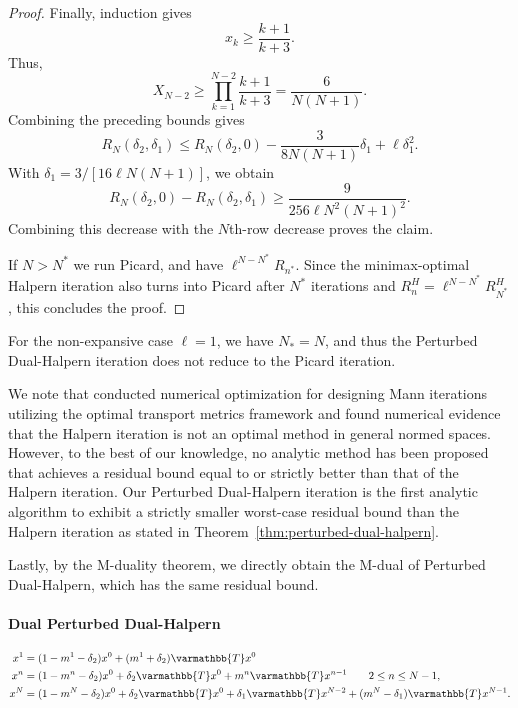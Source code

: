 \documentclass[pdflatex,sn-mathphys-num]{sn-jnl}%
\newcommand{\opT}{{\varmathbb{T}}}
\theoremstyle{thmstyleone}%
\theoremstyle{thmstyletwo}%
\theoremstyle{thmstylethree}%
\begin{document}
\begin{proof}
Finally, induction gives
\[x_k\ge\frac{k+1}{k+3}.\]
Thus,
\[X_{N-2}\ge\prod_{k=1}^{N-2}\frac{k+1}{k+3}=\frac{6}{N(N+1)}.\]
Combining the preceding bounds gives
\[R_N(\delta_2,\delta_1)\le R_N(\delta_2,0)-\frac{3}{8N(N+1)}\delta_1+\ell\delta_1^2.\]
With $\delta_1=3/[16\ell N(N+1)]$, we obtain
\[R_N(\delta_2,0)-R_N(\delta_2,\delta_1)\ge\frac{9}{256\ell N^2(N+1)^2}.\]
Combining this decrease with the $N$th-row decrease proves the claim.

If $N>N^*$ we run Picard, and have $\ell^{N-N^*}R_{n^*}$. Since the minimax-optimal Halpern iteration also turns into Picard after $N^*$ iterations and $R^H_n=\ell^{N-N^*}R^H_{N^*}$ \cite[Section~2.2]{bravo2026minimax}, this concludes the proof.
\end{proof}

For the non-expansive case $\ell=1$, we have $N_*=N$, and thus the Perturbed Dual-Halpern iteration does not reduce to the Picard iteration.

We note that \cite{cc2023} conducted numerical optimization for designing Mann iterations utilizing the optimal transport metrics framework and found numerical evidence that the Halpern iteration is not an optimal method in general normed spaces. However, to the best of our knowledge, no analytic method has been proposed that achieves a residual bound equal to or strictly better than that of the Halpern iteration. Our Perturbed Dual-Halpern iteration is the first analytic algorithm to exhibit a strictly smaller worst-case residual bound than the Halpern iteration as stated in Theorem~\ref{thm:perturbed-dual-halpern}.

Lastly, by the M-duality theorem, we directly obtain the M-dual of Perturbed Dual-Halpern, which has the same residual bound.

\paragraph{Dual Perturbed Dual-Halpern}

\begin{align*}
x^1&=(1-m^1-\delta_2)x^0 + (m^1+\delta_2) \opT x^0\\
     x^{n} &=(1-m^n-\delta_2)x^0 +\delta_2 \opT x^0+m^{n} \opT x^{n-1} \qquad 2\le n\le N-1,
    \\x^N &=  (1-m^N-\delta_2)x^0 +\delta_2 \opT x^0+\delta_1 \opT x^{N-2}+(m^{N}-\delta_1) \opT x^{N-1}. 
\end{align*}
\end{document}
